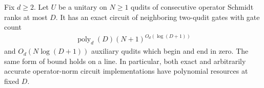\begin{lemma}
    \label{thm:mpu_general_exact_polynomial_circuits}
    \leanok
    Fix $d\geq2$. Let $U$ be a unitary on $N\geq1$ qudits of
    consecutive operator Schmidt ranks at most $D$.
    It has an exact circuit of neighboring two-qudit gates
    with gate count
    \begin{align}
        \operatorname{poly}_d(D)
        (N+1)^{O_d(\log(D+1))}
    \end{align}
    and $O_d(N\log(D+1))$ auxiliary qudits which begin and end
    in zero. The same form of bound holds on a line.
    In particular, both exact and arbitrarily accurate operator-norm
    circuit implementations have polynomial resources at fixed $D$.
\end{lemma}

